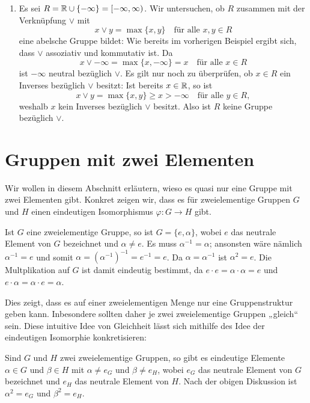 \begin{enumerate}[leftmargin=*]
 \item
  Es sei $R = \mathbb{R} \cup \{-\infty\} = [-\infty,\infty)$. Wir untersuchen, ob $R$ zusammen mit der Verknüpfung $\vee$ mit
  \[
   x \vee y = \max\{x,y\} \quad \text{für alle $x,y \in R$}
  \]
  eine abelsche Gruppe bildet: Wie bereits im vorherigen Beispiel ergibt sich, dass $\vee$ assoziativ und kommutativ ist. Da
  \[
   x \vee -\infty = \max\{x,-\infty\} = x \quad \text{für alle $x \in R$}
  \]
  ist $-\infty$ neutral bezüglich $\vee$. Es gilt nur noch zu überprüfen, ob $x \in R$ ein Inverses bezüglich $\vee$ besitzt: Ist bereits $x \in \mathbb{R}$, so ist
  \[
   x \vee y = \max\{x,y\} \geq x > -\infty
   \quad
   \text{für alle $y \in R$},
  \]
  weshalb $x$ kein Inverses bezüglich $\vee$ besitzt. Also ist $R$ keine Gruppe bezüglich $\vee$.
\end{enumerate}





\section{Gruppen mit zwei Elementen}\label{sec: groups with two elements}
Wir wollen in diesem Abschnitt erläutern, wieso es quasi nur eine Gruppe mit zwei Elementen gibt. Konkret zeigen wir, dass es für zweielementige Gruppen $G$ und $H$ einen eindeutigen Isomorphismus $\varphi \colon G \to H$ gibt.

Ist $G$ eine zweielementige Gruppe, so ist $G = \{e, \alpha\}$, wobei $e$ das neutrale Element von $G$ bezeichnet und $\alpha \neq e$. Es muss $\alpha^{-1} = \alpha$; ansonsten wäre nämlich $\alpha^{-1} = e$ und somit $\alpha = (\alpha^{-1})^{-1} = e^{-1} = e$. Da $\alpha = \alpha^{-1}$ ist $\alpha^2 = e$. Die Multplikation auf $G$ ist damit eindeutig bestimmt, da $e \cdot e = \alpha \cdot \alpha = e$ und $e \cdot \alpha = \alpha \cdot e = \alpha$.

Dies zeigt, dass es auf einer zweielementigen Menge nur eine Gruppenstruktur geben kann. Inbesondere sollten daher je zwei zweielementige Gruppen „gleich“ sein. Diese intuitive Idee von Gleichheit lässt sich mithilfe des Idee der eindeutigen Isomorphie konkretisieren:

Sind $G$ und $H$ zwei zweielementige Gruppen, so gibt es eindeutige Elemente $\alpha \in G$ und $\beta \in H$ mit $\alpha \neq e_G$ und $\beta \neq e_H$, wobei $e_G$ das neutrale Element von $G$ bezeichnet und $e_H$ das neutrale Element von $H$. Nach der obigen Diskussion ist $\alpha^2 = e_G$ und $\beta^2 = e_H$.

